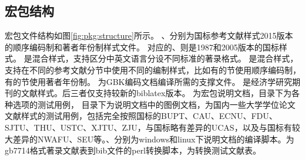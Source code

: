 \documentclass[11pt]{article} %
\begin{document}
\subsection{宏包结构}

宏包文件结构如图\ref{fig:pkg:structure}所示。
、分别为国标参考文献样式2015版本的顺序编码制和著者年份制样式文件。
对应的、则是1987和2005版本的国标样式。
是混合样式，支持区分中英文语言分设不同标准的著录格式。
是混合样式，支持在不同的参考文献分节中使用不同的编制样式，比如有的节使用顺序编码制，有的节使用著者年份制。
为GBK编码文档编译所需的支撑文件。
 是经济学研究期刊的文献样式。后三者仅支持较新的biblatex版本。
 为宏包说明文档，目录下为各种选项的测试用例，
目录下为说明文档中的图例文档，为国内一些大学学位论文文献样式的测试用例，包括完全按照国标的BUPT、CAU、ECNU、FDU、SJTU、THU、USTC、XJTU、ZJU，与国标略有差异的UCAS，以及与国标有较大差异的NWAFU、SEU等。、分别为windows和linux下说明文档的编译脚本。为gb7714格式著录文献表到bib文件的perl转换脚本，为转换测试文献表。
\end{document}
